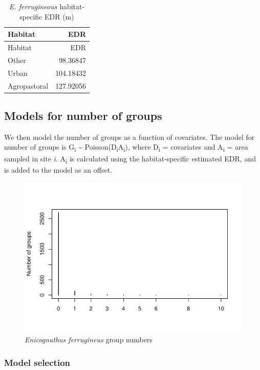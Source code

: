 \documentclass[]{article}
\begin{document}
\begin{longtable}[]{@{}lr@{}}
\caption{\textit{E. ferrugineous} habitat-specific EDR
(m)}\tabularnewline
\toprule
Habitat & EDR\tabularnewline
\midrule
\endfirsthead
\toprule
Habitat & EDR\tabularnewline
\midrule
\endhead
Other & 98.36847\tabularnewline
Urban & 104.18432\tabularnewline
Agropastoral & 127.92056\tabularnewline
\bottomrule
\end{longtable}

\subsection{Models for number of
groups}\label{models-for-number-of-groups}

We then model the number of groups as a function of covariates. The
model for number of groups is G\textsubscript{i} \textasciitilde{}
Poisson(D\textsubscript{i}A\textsubscript{i}), where D\textsubscript{i}
= covariates and A\textsubscript{i} = area sampled in site \emph{i}.
A\textsubscript{i} is calculated using the habitat-specific estimated
EDR, and is added to the model as an offset.

\begin{figure}[H]
\includegraphics{Patagonia_parrots_density_analysis_files/figure-latex/unnamed-chunk-6-1} \caption{\textit{Enicognathus ferrugineus} group numbers }\label{fig:unnamed-chunk-6}
\end{figure}

\subsubsection{Model selection}\label{model-selection}
\end{document}
